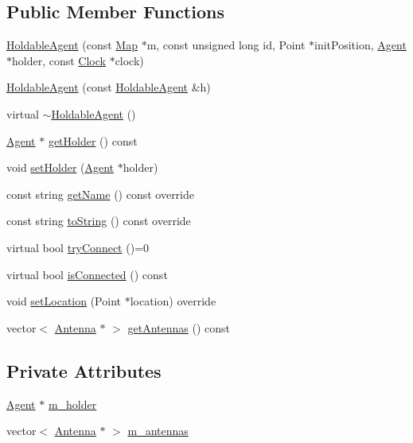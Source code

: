 \subsection*{Public Member Functions}
\begin{DoxyCompactItemize}
\item 
\hyperlink{class_holdable_agent_a04f50f7e7cd8efa7666657de6d5ef22c}{Holdable\+Agent} (const \hyperlink{class_map}{Map} $\ast$m, const unsigned long id, Point $\ast$init\+Position, \hyperlink{class_agent}{Agent} $\ast$holder, const \hyperlink{class_clock}{Clock} $\ast$clock)
\item 
\hyperlink{class_holdable_agent_a9b7c1494266c0a807d809461b59ced80}{Holdable\+Agent} (const \hyperlink{class_holdable_agent}{Holdable\+Agent} \&h)
\item 
virtual \hyperlink{class_holdable_agent_a33ef709d65757cd7e5c3f3cdc40e96a4}{$\sim$\+Holdable\+Agent} ()
\item 
\hyperlink{class_agent}{Agent} $\ast$ \hyperlink{class_holdable_agent_a51f29e5aecf9d288935ddae6da4096ed}{get\+Holder} () const
\item 
void \hyperlink{class_holdable_agent_a39b53c9c6cacca716f38fccc520e9f52}{set\+Holder} (\hyperlink{class_agent}{Agent} $\ast$holder)
\item 
const string \hyperlink{class_holdable_agent_ab330bb40de51a957ef8826af629f94a2}{get\+Name} () const override
\item 
const string \hyperlink{class_holdable_agent_a2c581226b8994f24b6b2306ae17dbb52}{to\+String} () const override
\item 
virtual bool \hyperlink{class_holdable_agent_a0789d757d81b43ee016e9362046f6dea}{try\+Connect} ()=0
\item 
virtual bool \hyperlink{class_holdable_agent_a1578388e51fefe7c19cd3b7c93a184eb}{is\+Connected} () const
\item 
void \hyperlink{class_holdable_agent_aec98d2fe325b48d9a84ad3dad44700e0}{set\+Location} (Point $\ast$location) override
\item 
vector$<$ \hyperlink{class_antenna}{Antenna} $\ast$ $>$ \hyperlink{class_holdable_agent_a226459f2721e5b7b3c72de4b0f05ffbb}{get\+Antennas} () const
\end{DoxyCompactItemize}
\subsection*{Private Attributes}
\begin{DoxyCompactItemize}
\item 
\hyperlink{class_agent}{Agent} $\ast$ \hyperlink{class_holdable_agent_ae9c449c1831f933b5b6b6f71e425279b}{m\+\_\+holder}
\item 
vector$<$ \hyperlink{class_antenna}{Antenna} $\ast$ $>$ \hyperlink{class_holdable_agent_a5f104212204e4c6761bed1d61fab100b}{m\+\_\+antennas}
\end{DoxyCompactItemize}


